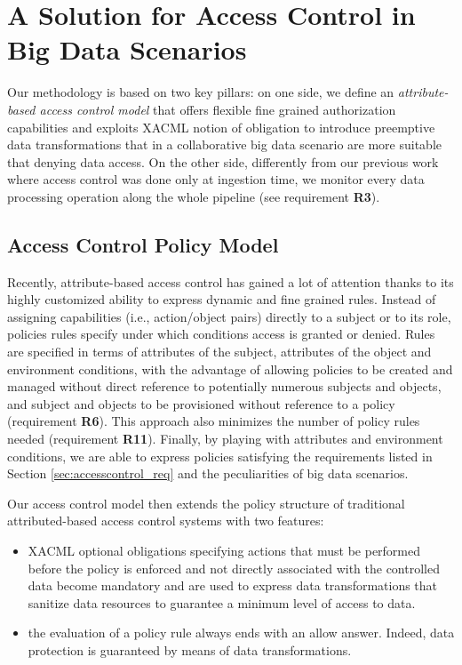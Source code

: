 \section{A Solution for Access Control in Big Data Scenarios}\label{sec:access}

Our methodology is based on two key pillars: on one side, we define an \textit{attribute-based access control model} that offers flexible fine grained authorization capabilities and exploits XACML notion of obligation to introduce preemptive data transformations that in a collaborative big data scenario are more suitable that denying data access.  On the other side,  differently from our previous work \cite{medes2021} where access control was done only at ingestion time, we monitor every data processing operation along the whole pipeline (see requirement {\bf R3}).

\subsection{Access Control Policy Model}\label{sec:ACmodel}

Recently, attribute-based access control has gained a lot of attention thanks to its highly customized ability to express dynamic and fine grained rules. Instead of assigning capabilities (i.e., action/object pairs) directly to a subject or to its role, policies rules specify under which conditions access is granted or denied. Rules are specified in terms of attributes of the subject, attributes of the object and environment conditions, with the advantage of allowing policies to be created and managed without direct reference to potentially numerous subjects and objects, and subject and objects to be provisioned without reference to a policy (requirement {\bf R6}). This approach also minimizes the number of policy rules needed (requirement {\bf R11}). Finally, by playing with attributes and environment conditions, we are able to express policies satisfying the requirements listed in Section \ref{sec:accesscontrol_req} and the peculiarities of big data scenarios. 

Our access control model then extends the policy structure of traditional attributed-based access control systems with two features:
\begin{itemize}
\item XACML optional obligations \cite{XACML3.0} specifying actions that must be performed before the policy is enforced and not directly associated with the controlled data become mandatory and are used to express data transformations that sanitize data resources to guarantee a minimum level of access to data. 
\item the evaluation of a policy rule always ends with an allow answer. Indeed, data protection is guaranteed by means of data transformations. 
\end{itemize}

